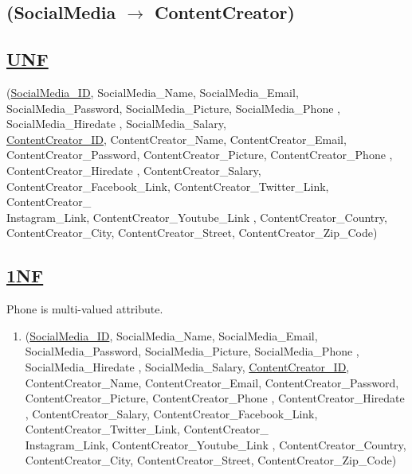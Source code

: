 \subsection{\texorpdfstring{\centering (SocialMedia $\rightarrow$ ContentCreator)}{ (ContentCreator-SocialMedia)}}

\subsection*{\underline{UNF}}

(\underline{SocialMedia\_ID}, SocialMedia\_Name, SocialMedia\_Email, SocialMedia\_Password, SocialMedia\_Picture, SocialMedia\_Phone , SocialMedia\_Hiredate , SocialMedia\_Salary,\\
\underline{ContentCreator\_ID}, ContentCreator\_Name, ContentCreator\_Email, ContentCreator\_Password, ContentCreator\_Picture, ContentCreator\_Phone , ContentCreator\_Hiredate , ContentCreator\_Salary,
ContentCreator\_Facebook\_Link, ContentCreator\_Twitter\_Link, ContentCreator\_\\Instagram\_Link, ContentCreator\_Youtube\_Link ,
ContentCreator\_Country, ContentCreator\_City, ContentCreator\_Street, ContentCreator\_Zip\_Code)

\subsection*{\underline{1NF}}
Phone is multi-valued attribute.
\vskip 0.2in

\begin{enumerate}
    \item
          (\underline{SocialMedia\_ID}, SocialMedia\_Name, SocialMedia\_Email, SocialMedia\_Password, SocialMedia\_Picture, SocialMedia\_Phone , SocialMedia\_Hiredate , SocialMedia\_Salary,
          \underline{ContentCreator\_ID}, ContentCreator\_Name, ContentCreator\_Email, ContentCreator\_Password, ContentCreator\_Picture, ContentCreator\_Phone , ContentCreator\_Hiredate , ContentCreator\_Salary,
          ContentCreator\_Facebook\_Link, ContentCreator\_Twitter\_Link, ContentCreator\_\\Instagram\_Link, ContentCreator\_Youtube\_Link ,
          ContentCreator\_Country, ContentCreator\_City, ContentCreator\_Street, ContentCreator\_Zip\_Code)
\end{enumerate}



